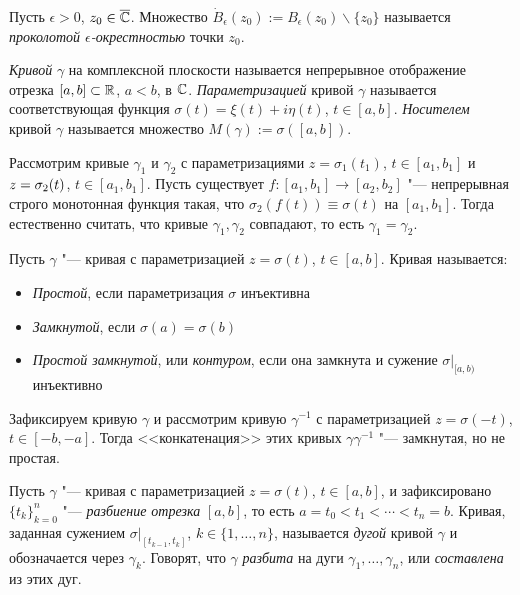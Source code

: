 \begin{definition}
	Пусть $\epsilon > 0$, $z_0 \in \overline{\mathbb{C}}$. Множество $\dot B_\epsilon(z_0) := B_\epsilon(z_0) \backslash \{z_0\}$ называется \textit{проколотой $\epsilon$-окрестностью} точки $z_0$.
\end{definition}

\begin{definition}
	\textit{Кривой} $\gamma$ на комплексной плоскости называется непрерывное отображение отрезка $[a, b] \subset \mathbb{R}$, $a < b$, в $\mathbb{C}$. \textit{Параметризацией} кривой $\gamma$ называется соответствующая 	функция $\sigma(t) = \xi(t) + i\eta(t)$, $t \in [a, b]$. \textit{Носителем} кривой $\gamma$ называется множество $M(\gamma) := \sigma([a, b])$. 
\end{definition}

\begin{note}
	Рассмотрим кривые $\gamma_1$ и $\gamma_2$ с параметризациями $z = \sigma_1(t_1)$, $t \in [a_1, b_1]$ и $z \hm= \sigma_2(t)$, $t \in [a_1, b_1]$. Пусть существует $f : [a_1, b_1] \to [a_2, b_2]$ "--- непрерывная строго монотонная функция такая, что $\sigma_2(f(t)) \equiv \sigma(t)$ на $[a_1, b_1]$. Тогда естественно считать, что кривые $\gamma_1, \gamma_2$ совпадают, то есть $\gamma_1 = \gamma_2$.
\end{note}

\begin{definition}
	Пусть $\gamma$ "--- кривая с параметризацией $z = \sigma(t)$, $t \in [a, b]$. Кривая называется:
	\begin{itemize}
		\item \textit{Простой}, если параметризация $\sigma$ инъективна
		\item \textit{Замкнутой}, если $\sigma(a) = \sigma(b)$
		\item \textit{Простой замкнутой}, или \textit{контуром}, если она замкнута и сужение $\sigma|_{[a, b)}$ инъективно
	\end{itemize}
\end{definition}

\begin{example}
	Зафиксируем кривую $\gamma$ и рассмотрим кривую $\gamma^{-1}$ с параметризацией $z = \sigma(-t)$, $t \in [-b, -a]$. Тогда <<конкатенация>> этих кривых $\gamma\gamma^{-1}$ "--- замкнутая, но не простая.
\end{example}

\begin{definition}
	Пусть $\gamma$ "--- кривая с параметризацией $z = \sigma(t)$, $t \in [a, b]$, и зафиксировано $\{t_k\}_{k = 0}^n$ "--- \textit{разбиение отрезка} $[a, b]$, то есть $a = t_0 < t_1 < \dotsb < t_n = b$. Кривая, заданная сужением $\sigma|_{[t_{k-1}, t_k]}$, $k \in \{1, \dotsc, n\}$, называется \textit{дугой} кривой $\gamma$ и обозначается через $\gamma_k$. Говорят, что $\gamma$ \textit{разбита} на дуги $\gamma_1, \dotsc, \gamma_n$, или \textit{составлена} из этих дуг.
\end{definition}

